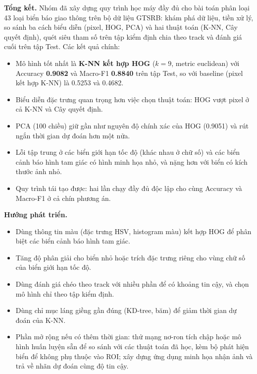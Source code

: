 
\textbf{Tổng kết.} Nhóm đã xây dựng quy trình học máy đầy đủ cho bài toán phân loại 43 loại biển báo giao thông trên bộ dữ liệu GTSRB: khám phá dữ liệu, tiền xử lý, so sánh ba cách biểu diễn (pixel, HOG, PCA) và hai thuật toán (K-NN, Cây quyết định), quét siêu tham số trên tập kiểm định chia theo track và đánh giá cuối trên tập Test. Các kết quả chính:

\begin{itemize}
    \item Mô hình tốt nhất là \textbf{K-NN kết hợp HOG} ($k=9$, metric euclidean) với Accuracy \textbf{0.9082} và Macro-F1 \textbf{0.8840} trên tập Test, so với baseline (pixel kết hợp K-NN) là 0.5253 và 0.4682.
    \item Biểu diễn đặc trưng quan trọng hơn việc chọn thuật toán: HOG vượt pixel ở cả K-NN và Cây quyết định.
    \item PCA (100 chiều) giữ gần như nguyên độ chính xác của HOG (0.9051) và rút ngắn thời gian dự đoán hơn một nửa.
    \item Lỗi tập trung ở các biển giới hạn tốc độ (khác nhau ở chữ số) và các biển cảnh báo hình tam giác có hình minh họa nhỏ, và nặng hơn với biển có kích thước ảnh nhỏ.
    \item Quy trình tái tạo được: hai lần chạy đầy đủ độc lập cho cùng Accuracy và Macro-F1 ở cả chín phương án.
\end{itemize}

\textbf{Hướng phát triển.}

\begin{itemize}
    \item Dùng thông tin màu (đặc trưng HSV, histogram màu) kết hợp HOG để phân biệt các biển cảnh báo hình tam giác.
    \item Tăng độ phân giải cho biển nhỏ hoặc trích đặc trưng riêng cho vùng chữ số của biển giới hạn tốc độ.
    \item Dùng đánh giá chéo theo track với nhiều phần để có khoảng tin cậy, và chọn mô hình chỉ theo tập kiểm định.
    \item Dùng chỉ mục láng giềng gần đúng (KD-tree, băm) để giảm thời gian dự đoán của K-NN.
    \item Phần mở rộng nếu có thêm thời gian: thử mạng nơ-ron tích chập hoặc mô hình huấn luyện sẵn để so sánh với các thuật toán đã học, kèm bộ phát hiện biển để không phụ thuộc vào ROI; xây dựng ứng dụng minh họa nhận ảnh và trả về nhãn dự đoán cùng độ tin cậy.
\end{itemize}
